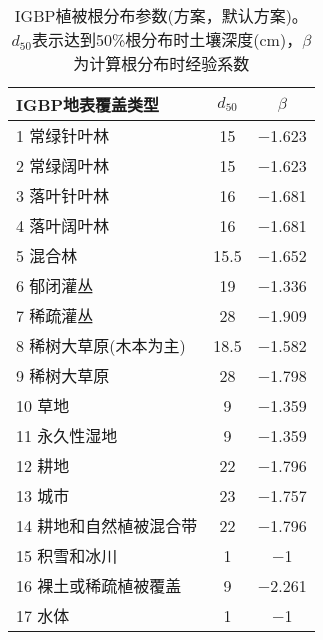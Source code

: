 \begin{table}[htbp]
  \centering
  \caption[IGBP植被根分布参数(\citet{schenk2002rooting}方案)]{IGBP植被根分布参数(\citet{schenk2002rooting}方案，默认方案)。$d_{50}$表示达到50\%根分布时土壤深度(cm)，$\beta$为计算根分布时经验系数}
  \label{tab:IGBPSchenkANDJackson2002方案默认方案}
  \begin{tabular}{@{}lcc@{}}
    \toprule
    IGBP地表覆盖类型        & $d_{50}$ & $\beta$        \\ \midrule
    1 常绿针叶林            & 15       & \num{ -1.623 } \\
    2 常绿阔叶林            & 15       & \num{ -1.623 } \\
    3 落叶针叶林            & 16       & \num{ -1.681 } \\
    4 落叶阔叶林            & 16       & \num{ -1.681 } \\
    5 混合林                & 15.5     & \num{ -1.652 } \\
    6 郁闭灌丛              & 19       & \num{ -1.336 } \\
    7 稀疏灌丛              & 28       & \num{ -1.909 } \\
    8 稀树大草原(木本为主)  & 18.5     & \num{ -1.582 } \\
    9 稀树大草原            & 28       & \num{ -1.798 } \\
    10 草地                 & 9        & \num{ -1.359 } \\
    11 永久性湿地           & 9        & \num{ -1.359 } \\
    12 耕地                 & 22       & \num{ -1.796 } \\
    13 城市                 & 23       & \num{ -1.757 } \\
    14 耕地和自然植被混合带 & 22       & \num{ -1.796 } \\
    15 积雪和冰川           & 1        & \num{ -1     } \\
    16 裸土或稀疏植被覆盖   & 9        & \num{ -2.261 } \\
    17 水体                 & 1        & \num {-1   }   \\ \bottomrule
  \end{tabular}
\end{table}


